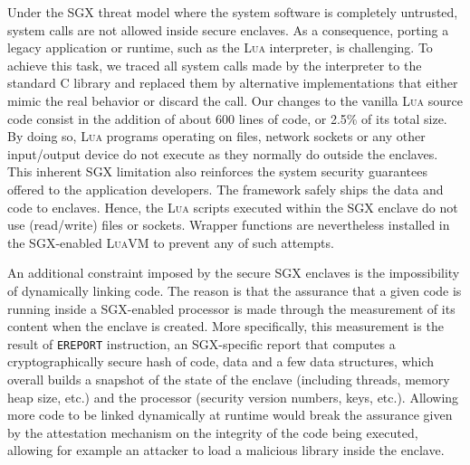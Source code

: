 Under the SGX threat model where the system software is completely untrusted, system calls are not allowed inside secure enclaves.
As a consequence, porting a legacy application or runtime, such as the \textsc{Lua} interpreter, is challenging.
To achieve this task, we traced all system calls made by the interpreter to the standard C library and replaced them by alternative implementations that either mimic the real behavior or discard the call.
Our changes to the vanilla \textsc{Lua} source code consist in the addition of about $600$ lines of code, or 2.5\% of its total size.
By doing so, \textsc{Lua} programs operating on files, network sockets or any other input/output device do not execute as they normally do outside the enclaves. %
This inherent SGX limitation also reinforces the system security guarantees offered to the application developers.
The \SYS{} framework safely ships the data and code to enclaves.
Hence, the \textsc{Lua} scripts executed within the SGX enclave do not use (read/write) files or sockets.
Wrapper functions are nevertheless installed in the SGX-enabled \textsc{LuaVM} to prevent any of such attempts.

An additional constraint imposed by the secure SGX enclaves is the impossibility of dynamically linking code. 
The reason is that the assurance that a given code is running inside a SGX-enabled processor is made through the measurement of its content when the enclave is created.
More specifically, this measurement is the result of \texttt{EREPORT} instruction, an SGX-specific report that computes a cryptographically secure hash of code, data and a few data structures, which overall builds a snapshot of the state of the enclave (including threads, memory heap size, etc.) and the processor (security version numbers, keys, etc.).
Allowing more code to be linked dynamically at runtime would break the assurance given by the attestation mechanism on the integrity of the code being executed, allowing for example an attacker to load a malicious library inside the enclave.

